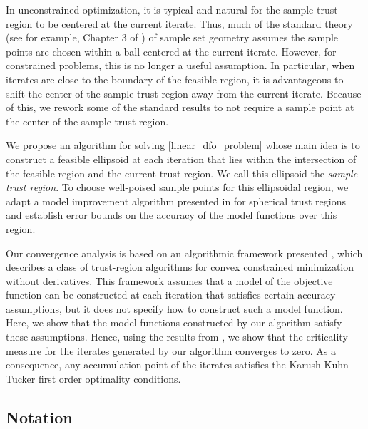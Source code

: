 \documentclass{article}
\begin{document}

In unconstrained optimization, it is typical and natural for the sample trust region to be centered at the current iterate.
Thus, much of the standard theory (see for example,
 Chapter 3 of \cite{introduction_book}) of sample set geometry assumes the sample points are chosen within a ball centered at the current iterate.
 However, for constrained problems,  this is no longer a useful assumption.
 In particular, when iterates are close to the boundary of the feasible region, it is advantageous to shift the center of the sample trust region away from the current iterate.
 Because of this, we rework some of the standard results to not require a sample point at the center of the sample trust region.


We propose an algorithm for solving \cref{linear_dfo_problem} whose main idea is to construct a feasible ellipsoid at each iteration that lies within the intersection of the feasible region and the current trust region.   We call this ellipsoid the {\em sample trust region}.
To choose well-poised sample points for this ellipsoidal region,  we adapt a model improvement algorithm presented in \cite{introduction_book} for spherical trust regions and establish error bounds on the accuracy of the model functions over this region.    

Our convergence analysis is based on an algorithmic framework presented \cite{Conejo:2013:GCT:2620806.2621814},  which describes a class of trust-region algorithms for convex constrained minimization without derivatives.   This framework assumes that a model of the objective function can be constructed at each iteration that satisfies certain accuracy assumptions, but it does not specify how to construct such a model function.    Here, we show that the model functions constructed by our algorithm satisfy these assumptions.  Hence,  using the results from \cite{Conejo:2013:GCT:2620806.2621814}, we show that
the criticality measure for the iterates generated by our algorithm converges to zero.  As a consequence, any accumulation point of the iterates satisfies the Karush-Kuhn-Tucker first order optimality conditions.  


\subsection{Notation}
\end{document}
